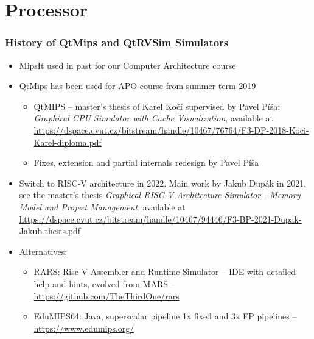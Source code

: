 \documentclass{beamer}
\subtitle{Lecture 03. Central Processing Unit (CPU)}
\author{Pavel Píša \phantom{xxxxxxx} Petr Štěpán \\ \small\texttt{pisa@fel.cvut.cz} \phantom{xx} \small\texttt{stepan@fel.cvut.cz} \\
\phantom{xxxxxxxxx} \\
License: CC-BY-SA}
\begin{document}
\maketitle

\section{Processor}

\begin{frame}
\frametitle{History of QtMips and QtRVSim Simulators}

\begin{itemize}
\item MipsIt used in past for our Computer Architecture course
\item QtMips has been used for APO course from summer term 2019
\begin{itemize}
\item QtMIPS -- master's thesis of Karel Kočí supervised by Pavel Píša: \textit{Graphical CPU Simulator with Cache Visualization}, available at
{\footnotesize \url{https://dspace.cvut.cz/bitstream/handle/10467/76764/F3-DP-2018-Koci-Karel-diploma.pdf}}
\item Fixes, extension and partial internals redesign by Pavel Píša
\end{itemize}
\item Switch to RISC-V architecture in 2022. Main work by Jakub Dupák in 2021, see the master's thesis \textit{Graphical RISC-V Architecture Simulator - Memory Model and Project Management}, available at
{\footnotesize \url{https://dspace.cvut.cz/bitstream/handle/10467/94446/F3-BP-2021-Dupak-Jakub-thesis.pdf}}
\item Alternatives:
\begin{itemize}
 \item RARS: Risc-V Assembler and Runtime Simulator -- IDE with detailed help and hints, evolved from MARS -- \url{https://github.com/TheThirdOne/rars}
 \item EduMIPS64: Java, superscalar pipeline 1x fixed and 3x FP pipelines -- \url{https://www.edumips.org/}
\end{itemize}
\end{itemize}

\end{frame}
\end{document}
